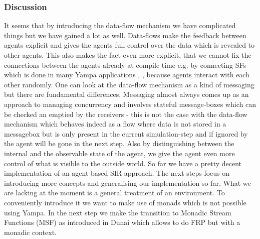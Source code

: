 \subsubsection{Discussion}
It seems that by introducing the data-flow mechanism we have complicated things but we have gained a lot as well. Data-flows make the feedback between agents explicit and gives the agents full control over the data which is revealed to other agents. This also makes the fact even more explicit, that we cannot fix the connections between the agents already at compile time e.g. by connecting SFs which is done in many Yampa applications \cite{nilsson_functional_2002}, \cite{courtney_yampa_2003}, \cite{nilsson_declarative_2014} because agents interact with each other randomly. One can look at the data-flow mechanism as a kind of messaging but there are fundamental differences. Messaging almost always comes up as an approach to managing concurrency and involves stateful message-boxes which can be checked an emptied by the receivers - this is not the case with the data-flow mechanism which behaves indeed as a flow where data is not stored in a messagebox but is only present in the current simulation-step and if ignored by the agent will be gone in the next step.
Also by distinguishing between the internal and the observable state of the agent, we give the agent even more control of what is visible to the outside world.
So far we have a pretty decent implementation of an agent-based SIR approach. The next steps focus on introducing more concepts and generalising our implementation so far. What we are lacking at the moment is a general treatment of an environment. To conveniently introduce it we want to make use of monads which is not possible using Yampa. In the next step we make the transition to Monadic Stream Functions (MSF) as introduced in Dunai \cite{perez_functional_2016} which allows to do FRP but with a monadic context.